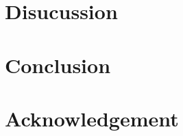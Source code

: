 \documentclass[a4paper]{report}
\begin{document}
\chapter{Disucussion}

\chapter{Conclusion}

\chapter*{Acknowledgement}


\newpage
{}
\renewcommand{\bibname}{References}






\end{document}
